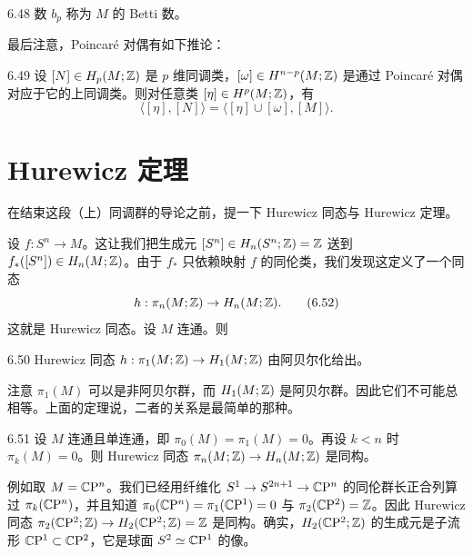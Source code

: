 \begin{definition}{6.48}
  数 $b_p$ 称为 $M$ 的 Betti 数。
\end{definition}

最后注意，Poincaré 对偶有如下推论：

\begin{proposition}{6.49}
  设 $[N]\in H_p(M;\mathbb{Z})$ 是 $p$ 维同调类，$[\omega]\in H^{n-p}(M;\mathbb{Z})$ 是通过 Poincaré 对偶对应于它的上同调类。则对任意类 $[\eta]\in H^p(M;\mathbb{Z})$，有
  \begin{equation}
    \langle[\eta],[N]\rangle=\langle[\eta]\cup[\omega],[M]\rangle.
    \tag{6.51}
  \end{equation}
\end{proposition}


\section{Hurewicz 定理}

在结束这段（上）同调群的导论之前，提一下 Hurewicz 同态与 Hurewicz 定理。

设 $f:S^n\to M$。这让我们把生成元 $[S^n]\in H_n(S^n;\mathbb{Z})=\mathbb{Z}$ 送到 $f_*([S^n])\in H_n(M;\mathbb{Z})$。由于 $f_*$ 只依赖映射 $f$ 的同伦类，我们发现这定义了一个同态
\begin{equation}
  h:\pi_n(M;\mathbb{Z})\to H_n(M;\mathbb{Z}).
  \tag{6.52}
\end{equation}
这就是 Hurewicz 同态。设 $M$ 连通。则

\begin{theorem}{6.50}
  Hurewicz 同态 $h:\pi_1(M;\mathbb{Z})\to H_1(M;\mathbb{Z})$ 由阿贝尔化给出。
\end{theorem}

注意 $\pi_1(M)$ 可以是非阿贝尔群，而 $H_1(M;\mathbb{Z})$ 是阿贝尔群。因此它们不可能总相等。上面的定理说，二者的关系是最简单的那种。

\begin{theorem}{6.51}
  设 $M$ 连通且单连通，即 $\pi_0(M)=\pi_1(M)=0$。再设 $k<n$ 时 $\pi_k(M)=0$。则 Hurewicz 同态 $\pi_n(M;\mathbb{Z})\to H_n(M;\mathbb{Z})$ 是同构。
\end{theorem}

例如取 $M=\mathbb{C}\mathrm{P}^n$。我们已经用纤维化 $S^1\to S^{2n+1}\to\mathbb{C}\mathrm{P}^n$ 的同伦群长正合列算过 $\pi_k(\mathbb{C}\mathrm{P}^n)$，并且知道 $\pi_0(\mathbb{C}\mathrm{P}^n)=\pi_1(\mathbb{C}\mathrm{P}^1)=0$ 与 $\pi_2(\mathbb{C}\mathrm{P}^2)=\mathbb{Z}$。因此 Hurewicz 同态 $\pi_2(\mathbb{C}\mathrm{P}^2;\mathbb{Z})\to H_2(\mathbb{C}\mathrm{P}^2;\mathbb{Z})=\mathbb{Z}$ 是同构。确实，$H_2(\mathbb{C}\mathrm{P}^2;\mathbb{Z})$ 的生成元是子流形 $\mathbb{C}\mathrm{P}^1\subset\mathbb{C}\mathrm{P}^2$，它是球面 $S^2\simeq\mathbb{C}\mathrm{P}^1$ 的像。

